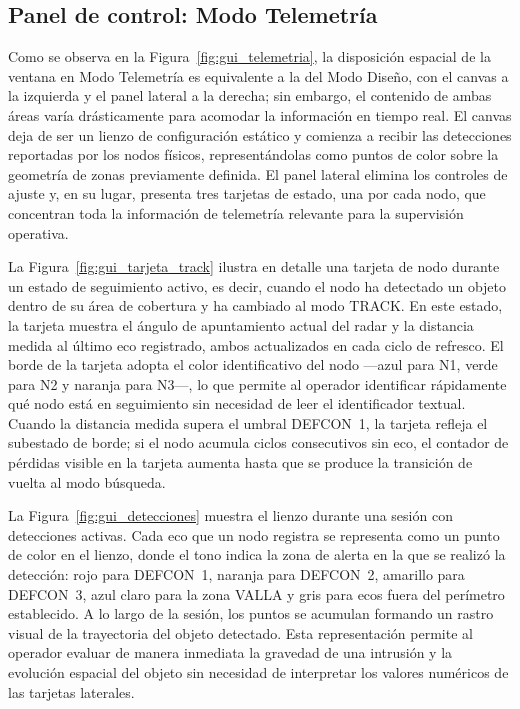 \subsection{Panel de control: Modo Telemetría}

Como se observa en la Figura~\ref{fig:gui_telemetria}, la disposición espacial de la ventana en Modo Telemetría es equivalente a la del Modo Diseño, con el canvas a la izquierda y el panel lateral a la derecha; sin embargo, el contenido de ambas áreas varía drásticamente para acomodar la información en tiempo real. El canvas deja de ser un lienzo de configuración estático y comienza a recibir las detecciones reportadas por los nodos físicos, representándolas como puntos de color sobre la geometría de zonas previamente definida. El panel lateral elimina los controles de ajuste y, en su lugar, presenta tres tarjetas de estado, una por cada nodo, que concentran toda la información de telemetría relevante para la supervisión operativa.

La Figura~\ref{fig:gui_tarjeta_track} ilustra en detalle una tarjeta de nodo durante un estado de seguimiento activo, es decir, cuando el nodo ha detectado un objeto dentro de su área de cobertura y ha cambiado al modo TRACK. En este estado, la tarjeta muestra el ángulo de apuntamiento actual del radar y la distancia medida al último eco registrado, ambos actualizados en cada ciclo de refresco. El borde de la tarjeta adopta el color identificativo del nodo ---azul para N1, verde para N2 y naranja para N3---, lo que permite al operador identificar rápidamente qué nodo está en seguimiento sin necesidad de leer el identificador textual. Cuando la distancia medida supera el umbral DEFCON~1, la tarjeta refleja el subestado de borde; si el nodo acumula ciclos consecutivos sin eco, el contador de pérdidas visible en la tarjeta aumenta hasta que se produce la transición de vuelta al modo búsqueda.


La Figura~\ref{fig:gui_detecciones} muestra el lienzo durante una sesión con detecciones activas. Cada eco que un nodo registra se representa como un punto de color en el lienzo, donde el tono indica la zona de alerta en la que se realizó la detección: rojo para DEFCON~1, naranja para DEFCON~2, amarillo para DEFCON~3, azul claro para la zona VALLA y gris para ecos fuera del perímetro establecido. A lo largo de la sesión, los puntos se acumulan formando un rastro visual de la trayectoria del objeto detectado. Esta representación permite al operador evaluar de manera inmediata la gravedad de una intrusión y la evolución espacial del objeto sin necesidad de interpretar los valores numéricos de las tarjetas laterales.

